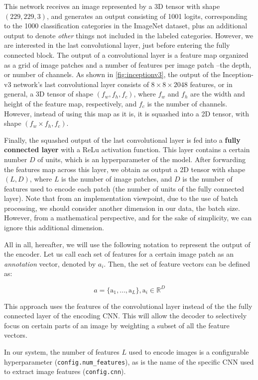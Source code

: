 This network receives an image represented by a 3D tensor with shape $(229, 229, 3)$, and generates an output consisting of 1001 logits, corresponding to the 1000 classification categories in the ImageNet dataset, plus an additional output to denote \textit{other} things not included in the labeled categories. However, we are interested in the last convolutional layer, just before entering the fully connected block. The output of a convolutional layer is a feature map organized as a grid of image patches and a number of features per image patch --the depth, or number of channels. As shown in \cref{fig:inceptionv3}, the output of the Inception-v3 network's last convolutional layer consists of $8 \times 8 \times 2048$ features, or in general, a 3D tensor of shape $(f_w, f_h, f_c)$, where $f_w$ and $f_h$ are the width and height of the feature map, respectively, and $f_c$ is the number of channels. However, instead of using this map as it is, it is squashed into a 2D tensor, with shape $(f_w \times f_h, f_c)$.

Finally, the squashed output of the last convolutional layer is fed into a \textbf{fully connected layer} with a ReLu activation function. This layer contains a certain number $D$ of units, which is an hyperparameter of the model. After forwarding the features map across this layer, we obtain as output a 2D tensor with shape $(L, D)$, where $L$ is the number of image patches, and $D$ is the number of features used to encode each patch (the number of units of the fully connected layer). Note that from an implementation viewpoint, due to the use of batch processing, we should consider another dimension in our data, the batch size. However, from a mathematical perspective, and for the sake of simplicity, we can ignore this additional dimension. 

All in all, hereafter, we will use the following notation to represent the output of the encoder. 
Let us call each set of features for a certain image patch as an \textit{annotation} vector, denoted by $a_i$. Then, the set of feature vectors can be defined as:

$$a = \{\text{a}_1,...,\text{a}_L \}, \text{a}_i \in \mathbb{R}^D$$

This approach uses the features of the convolutional layer instead of the the fully connected layer of the encoding CNN. This will allow the decoder to selectively focus on certain parts of an image by weighting a subset of all the feature vectors.

In our system, the number of features $L$ used to encode images is a configurable hyperparameter (\lstinline{config.num_features}), as is the name of the specific CNN used to extract image features (\lstinline{config.cnn}).

